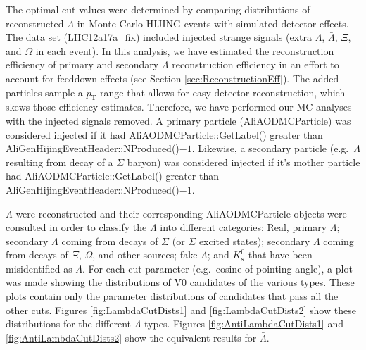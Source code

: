 The optimal cut values were determined by comparing distributions of reconstructed $\Lambda$ in Monte Carlo HIJING events with simulated detector effects.  
The data set (LHC12a17a\_fix) included injected strange signals (extra $\Lambda$, $\bar{\Lambda}$, $\Xi$, and $\Omega$ in each event).  
In this analysis, we have estimated the reconstruction efficiency of primary and secondary $\Lambda$ reconstruction efficiency in an effort to account for feeddown effects (see Section \ref{sec:ReconstructionEff}).
The added particles sample a $p_\mathrm{T}$ range that allows for easy detector reconstruction, which skews those efficiency estimates.
Therefore, we have performed our MC analyses with  the injected signals removed.  A primary particle (AliAODMCParticle) was considered injected if it had AliAODMCParticle::GetLabel() greater than AliGenHijingEventHeader::NProduced()$-1$. 
Likewise, a secondary particle (e.g.\ $\Lambda$ resulting from decay of a $\Sigma$ baryon) was considered injected if it's mother particle had AliAODMCParticle::GetLabel() greater than AliGenHijingEventHeader::NProduced()$-1$.  

$\Lambda$ were reconstructed and their corresponding AliAODMCParticle objects were consulted in order to classify the $\Lambda$ into different categories: Real, primary $\Lambda$; secondary $\Lambda$ coming from decays of $\Sigma$ (or $\Sigma$ excited states); secondary $\Lambda$ coming from decays of $\Xi$, $\Omega$, and other sources; fake $\Lambda$; and $K^0_\mathrm{s}$ that have been misidentified as $\Lambda$.  
For each cut parameter (e.g.\ cosine of pointing angle), a plot was made showing the distributions of V0 candidates of the various types.  
These plots contain only the parameter distributions of candidates that pass all the other cuts.  Figures \ref{fig:LambdaCutDists1} and \ref{fig:LambdaCutDists2} show these distributions for the different $\Lambda$ types.  
Figures \ref{fig:AntiLambdaCutDists1} and \ref{fig:AntiLambdaCutDists2} show the equivalent results for $\bar{\Lambda}$.

